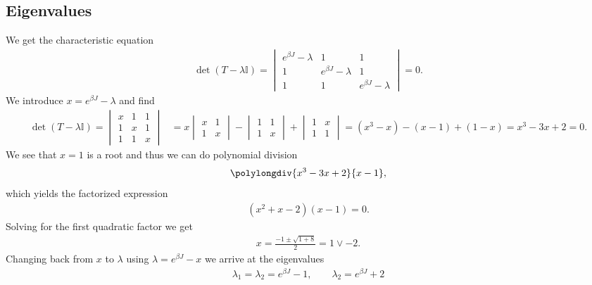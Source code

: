 \documentclass[reprint, amsmath, amssymb, aps, onecolumn]{revtex4-2}
\begin{document}
{{\subsection{Eigenvalues}\label{sec:T_eigval}
\noindent We get the characteristic equation 
\begin{align*}
  \det{(T - \lambda \mathbb{I} )} 
  = \begin{vmatrix}
    e^{\beta J} -\lambda & 1 & 1 \\
    1 & e^{\beta J} -\lambda & 1 \\
    1 & 1 & e^{\beta J} -\lambda
  \end{vmatrix} = 0.
\end{align*}
We introduce $x = e^{\beta J} -\lambda$ and find
\begin{align*}
  \det{(T - \lambda \mathbb{I} )} 
  = \begin{vmatrix}
    x & 1 & 1 \\
    1 & x & 1 \\
    1 & 1 & x
  \end{vmatrix}
  &= x \begin{vmatrix} 
            x & 1 \\ 
            1 & x  
        \end{vmatrix}
      - \begin{vmatrix} 
        1 & 1 \\ 
        1 & x   
        \end{vmatrix} 
      + \begin{vmatrix} 
        1 & x \\ 
        1 & 1   
        \end{vmatrix} = (x^3 - x) - (x - 1) + (1 - x) = x^3 - 3x + 2 = 0.
\end{align*}
We see that $x = 1$ is a root and thus we can do polynomial division
\begin{align*}
  {\polylongdiv{x^3 - 3x + 2}{x-1}},
\end{align*}
which yields the factorized expression 
\begin{align*}
  (x^2 + x -2)(x-1) = 0.
\end{align*}
Solving for the first quadratic factor we get 
\begin{align*}
  x = \frac{-1 \pm \sqrt{1 + 8}}{2} = 1 \vee -2.
\end{align*}
Changing back from $x$ to $\lambda$ using $\lambda = e^{\beta J}-x$ we arrive at the eigenvalues
\begin{align*}
  \lambda_1 = \lambda_2 = e^{\beta J} - 1, \qquad \lambda_2 = e^{\beta J} + 2
\end{align*}
%
}}
\end{document}

